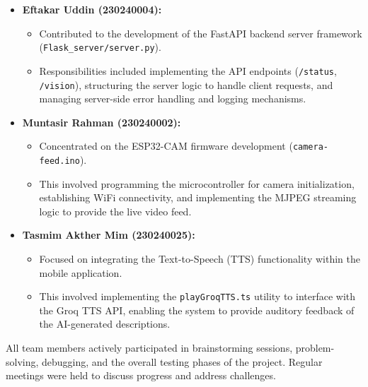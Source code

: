 \documentclass[12pt, a4paper]{report}
\begin{document}
\begin{itemize}
    \item \textbf{Eftakar Uddin (230240004):}
    \begin{itemize}
        \item Contributed to the development of the FastAPI backend server framework (\texttt{Flask\_server/server.py}).
        \item Responsibilities included implementing the API endpoints (\texttt{/status}, \texttt{/vision}), structuring the server logic to handle client requests, and managing server-side error handling and logging mechanisms.
    \end{itemize}

    \item \textbf{Muntasir Rahman (230240002):}
    \begin{itemize}
        \item Concentrated on the ESP32-CAM firmware development (\texttt{camera-feed.ino}).
        \item This involved programming the microcontroller for camera initialization, establishing WiFi connectivity, and implementing the MJPEG streaming logic to provide the live video feed.
    \end{itemize}

    \item \textbf{Tasmim Akther Mim (230240025):}
    \begin{itemize}
        \item Focused on integrating the Text-to-Speech (TTS) functionality within the mobile application.
        \item This involved implementing the \texttt{playGroqTTS.ts} utility to interface with the Groq TTS API, enabling the system to provide auditory feedback of the AI-generated descriptions.
    \end{itemize}
\end{itemize}

All team members actively participated in brainstorming sessions, problem-solving, debugging, and the overall testing phases of the project. Regular meetings were held to discuss progress and address challenges.
\end{document}
